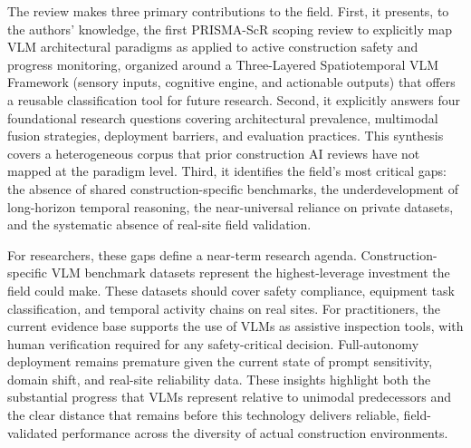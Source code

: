 \documentclass[10pt,letterpaper]{article}
\begin{document}
The review makes three primary contributions to the field. First, it presents, to the authors' knowledge, the first PRISMA-ScR scoping review to explicitly map VLM architectural paradigms as applied to active construction safety and progress monitoring, organized around a Three-Layered Spatiotemporal VLM Framework (sensory inputs, cognitive engine, and actionable outputs) that offers a reusable classification tool for future research. Second, it explicitly answers four foundational research questions covering architectural prevalence, multimodal fusion strategies, deployment barriers, and evaluation practices. This synthesis covers a heterogeneous corpus that prior construction AI reviews have not mapped at the paradigm level. Third, it identifies the field's most critical gaps: the absence of shared construction-specific benchmarks, the underdevelopment of long-horizon temporal reasoning, the near-universal reliance on private datasets, and the systematic absence of real-site field validation.

For researchers, these gaps define a near-term research agenda. Construction-specific VLM benchmark datasets represent the highest-leverage investment the field could make. These datasets should cover safety compliance, equipment task classification, and temporal activity chains on real sites. For practitioners, the current evidence base supports the use of VLMs as assistive inspection tools, with human verification required for any safety-critical decision. Full-autonomy deployment remains premature given the current state of prompt sensitivity, domain shift, and real-site reliability data. These insights highlight both the substantial progress that VLMs represent relative to unimodal predecessors and the clear distance that remains before this technology delivers reliable, field-validated performance across the diversity of actual construction environments.
\end{document}
